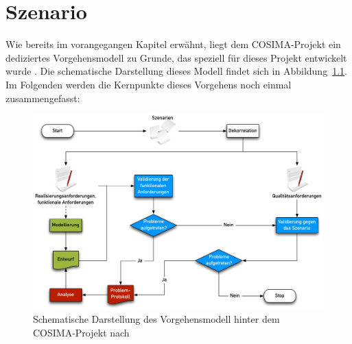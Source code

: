 
\chapter{Szenario} %
\label{cha:szenario}

  Wie bereits im vorangegangen Kapitel erwähnt, liegt dem COSIMA-Projekt ein dediziertes Vorgehensmodell zu Grunde, das speziell für dieses Projekt entwickelt wurde \citep[S. 7]{bericht}. Die schematische Darstellung dieses Modell findet sich in Abbildung~\ref{fig:vorgehensmodell}. Im Folgenden werden die Kernpunkte dieses Vorgehens noch einmal zusammengefasst:

  \begin{figure}[!ht]
    \centering
      \includegraphics[width=.9\textwidth]{images/Vorgehensmodell}
    \caption{Schematische Darstellung des Vorgehensmodell hinter dem COSIMA-Projekt nach \citep{bericht}}
    \label{fig:vorgehensmodell}
  \end{figure}

